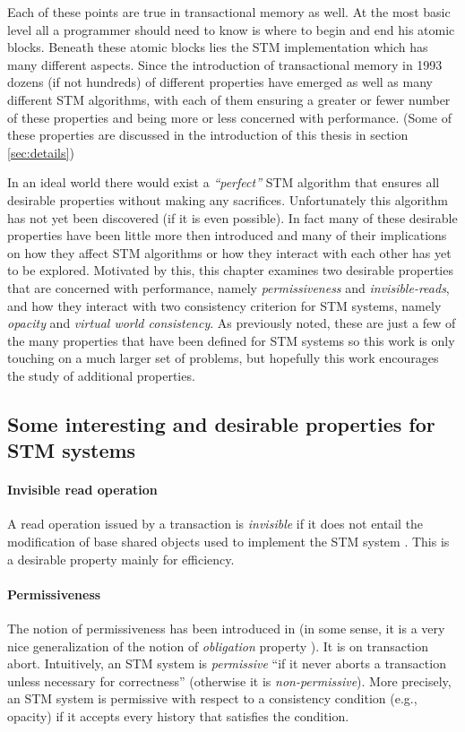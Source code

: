 Each of these points are true in transactional memory as well.
At the most basic level all a programmer should need to know is where
to begin and end his atomic blocks.
Beneath these atomic blocks lies the STM implementation which has many different aspects.
Since the introduction of transactional memory in 1993 \cite{HM93} dozens (if not hundreds) of different properties have emerged
as well as many different STM algorithms,
with each of them ensuring a greater or fewer number of these properties and being more or less
concerned with performance.
(Some of these properties are discussed in the introduction of this thesis in section \ref{sec:details})


In an ideal world there would exist a \emph{``perfect''} STM algorithm that ensures all desirable properties
without making any sacrifices.
Unfortunately this algorithm has not yet been discovered (if it is even possible).
In fact many of these desirable properties have been little more then introduced and many of their implications
on how they affect STM algorithms or how they interact with each other has yet to be explored.
Motivated by this, this chapter examines two desirable properties that are concerned with performance,
namely \emph{permissiveness} and \emph{invisible-reads}, and how they interact with two consistency
criterion for STM systems, namely \emph{opacity} and \emph{virtual world consistency}.
As previously noted, these are just a few of the many properties that have been defined for STM systems
so this work is only touching on a much larger set of problems, but hopefully this work encourages
the study of additional properties.


\subsection{Some interesting and desirable properties for STM systems} \label{sec:def-perm}

\paragraph{Invisible read operation}
A read operation issued by a transaction is {\it invisible} if it does 
not entail the modification of base shared objects used to implement 
the STM system  \cite{MSHAESS06}.
This is a desirable property mainly for efficiency. 


\paragraph{Permissiveness}
The  notion  of permissiveness  has been introduced in  \cite{GHS08}
(in some sense,  it is a  very  nice generalization of the notion  of  
{\it obligation} property \cite{IR09-a}). It is on  transaction abort. 
Intuitively, an STM system is {\it permissive}  ``if it  never aborts a 
transaction unless necessary for  correctness'' (otherwise it is 
{\it non-permissive}).  More precisely, 
an STM system is permissive with respect to a consistency condition 
(e.g., opacity) if  it accepts  every history that satisfies the condition. 


